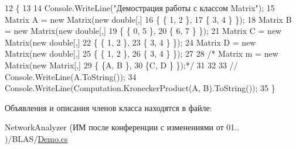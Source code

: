 \begin{DoxyCode}
12         \{
13 
14             Console.WriteLine(\textcolor{stringliteral}{"Демострация работы с классом Matrix"}); 
15             Matrix A = \textcolor{keyword}{new} Matrix(\textcolor{keyword}{new} \textcolor{keywordtype}{double}[,]
16               \{ \{ 1, 2 \},
17                 \{ 3, 4 \} \});
18             Matrix B = \textcolor{keyword}{new} Matrix(\textcolor{keyword}{new} \textcolor{keywordtype}{double}[,]
19                 \{ \{ 0, 5 \},
20                 \{ 6, 7 \} \});
21             Matrix C = \textcolor{keyword}{new} Matrix(\textcolor{keyword}{new} \textcolor{keywordtype}{double}[,]
22                 \{ \{ 1, 2 \},
23                 \{ 3, 4 \} \});
24             Matrix D = \textcolor{keyword}{new} Matrix(\textcolor{keyword}{new} \textcolor{keywordtype}{double}[,]
25                 \{ \{ 1, 2 \},
26                 \{ 3, 4 \} \});
27 
28             \textcolor{comment}{/* Matrix m = new Matrix(new Matrix[,]
}
29 \textcolor{comment}{                  \{ \{A, B \},
}
30 \textcolor{comment}{                  \{C, D \} \});*/}
31 
32 
33             \textcolor{comment}{// Console.WriteLine(A.ToString());}
34             Console.WriteLine(Computation.KroneckerProduct(A, B).ToString());
35         \}
\end{DoxyCode}


Объявления и описания членов класса находятся в файле\+:\begin{DoxyCompactItemize}
\item 
Network\+Analyzer (ИМ после конференции  с изменениями от 01.. )/\+B\+L\+A\+S/\hyperlink{_b_l_a_s_2_demo_8cs}{Demo.\+cs}\end{DoxyCompactItemize}
